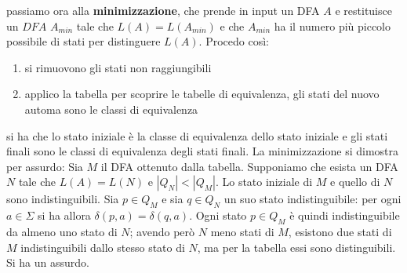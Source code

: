 passiamo ora alla \textbf{minimizzazione}, che prende in input un DFA $A$ e restituisce un $DFA$ $A_{min}$ tale che $L(A)=L(A_{min})$ e che $A_{min}$ ha il numero più piccolo possibile di stati per distinguere $L(A)$.
Procedo così:
\begin{enumerate}
	\item si rimuovono gli stati non raggiungibili
	\item applico la tabella per scoprire le tabelle di equivalenza, gli stati del nuovo automa sono le classi di equivalenza
\end{enumerate}
si ha che lo stato iniziale è la classe di equivalenza dello stato iniziale e gli stati finali sono le classi di equivalenza degli stati finali.
La minimizzazione si dimostra per assurdo:
Sia $M$ il DFA ottenuto dalla tabella. Supponiamo che esista un DFA $N$ tale che $L(A)=L(N)$ e $|Q_N|<|Q_M|$. Lo stato iniziale di $M$ e quello di $N$ sono indistinguibili. Sia $p\in Q_M$ e sia $q\in Q_N$ un suo stato indistinguibile: per ogni $a\in\Sigma$ si ha allora $\delta(p,a)=\delta(q,a)$. Ogni stato $p\in Q_M$ è quindi indistinguibile da almeno uno stato di $N$; avendo però $N$ meno stati di $M$, esistono due stati di $M$ indistinguibili dallo stesso stato di $N$, ma per la tabella essi sono distinguibili. Si ha un assurdo.
